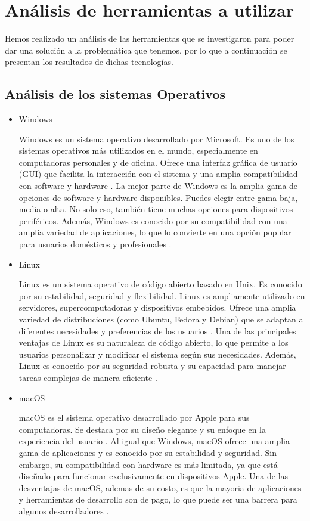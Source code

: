 \section{Análisis de herramientas a utilizar}
Hemos realizado un análisis de las herramientas que se investigaron para poder dar una solución a la problemática que tenemos,
por lo que a continuación se presentan los resultados de dichas tecnologías.

\subsection{Análisis de los sistemas Operativos}

\begin{itemize}
    \item Windows
    
    Windows es un sistema operativo desarrollado por Microsoft. Es uno de los sistemas operativos más utilizados en el mundo, especialmente en computadoras personales y 
    de oficina. Ofrece una interfaz gráfica de usuario (GUI) que facilita la interacción con el sistema y una amplia compatibilidad con software y hardware \cite{WindowsLenovo}.
    La mejor parte de Windows es la amplia gama de opciones de software y hardware disponibles. Puedes elegir entre gama baja, media o alta. No solo eso, también tiene muchas 
    opciones para dispositivos periféricos. Además, Windows es conocido por su compatibilidad con una amplia variedad de aplicaciones, lo que lo convierte en una opción 
    popular para usuarios domésticos y profesionales \cite{WindowsVSMac}.

    \item Linux
    
    Linux es un sistema operativo de código abierto basado en Unix. Es conocido por su estabilidad, seguridad y flexibilidad. Linux es ampliamente utilizado en servidores,
    supercomputadoras y dispositivos embebidos. Ofrece una amplia variedad de distribuciones (como Ubuntu, Fedora y Debian) que se adaptan a diferentes necesidades y 
    preferencias de los usuarios \cite{LinuxUbuntu}.
    Una de las principales ventajas de Linux es su naturaleza de código abierto, lo que permite a los usuarios personalizar y modificar el sistema según sus necesidades. 
    Además, Linux es conocido por su seguridad robusta y su capacidad para manejar tareas complejas de manera eficiente \cite{LinuxUbuntu}.
    

    \item macOS
    
    macOS es el sistema operativo desarrollado por Apple para sus computadoras. Se destaca por su diseño elegante y su enfoque en la experiencia del usuario \cite{MacOS}.
    Al igual que Windows, macOS ofrece una amplia gama de aplicaciones y es conocido por su estabilidad y seguridad. Sin embargo, su compatibilidad con hardware es 
    más limitada, ya que está diseñado para funcionar exclusivamente en dispositivos Apple. Una de las desventajas de macOS, ademas de su costo, es que la mayoria de
    aplicaciones y herramientas de desarrollo son de pago, lo que puede ser una barrera para algunos desarrolladores \cite{WindowsVSMac}.

\end{itemize}

